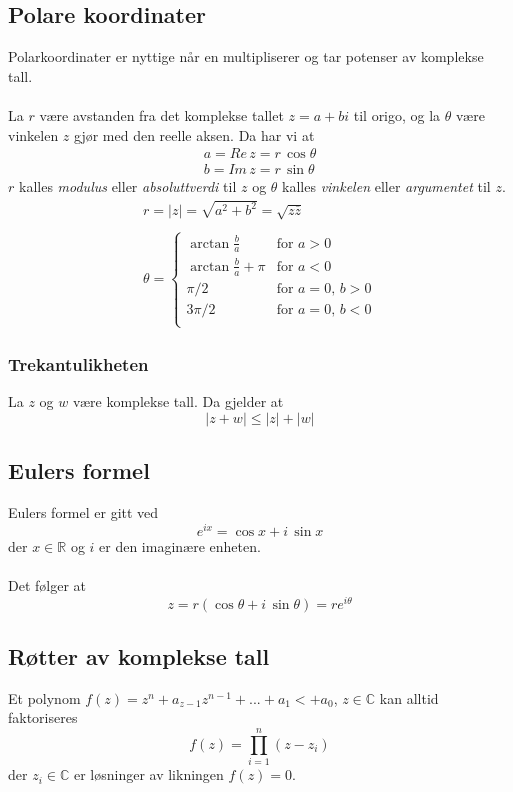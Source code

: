 \documentclass{article}
\begin{document}
\subsection{Polare koordinater}
Polarkoordinater er nyttige når en multipliserer og tar potenser av komplekse tall.
\\\\
La $r$ være avstanden fra det komplekse tallet $z =
a + bi$ til origo, og la $\theta$ være vinkelen $z$ gjør med den reelle aksen. Da har vi at
\begin{gather*}
    a = Re \, z = r \, \cos{\theta} \\
    b = Im \, z = r \, \sin{\theta}
\end{gather*}
$r$ kalles \textit{modulus} eller \textit{absoluttverdi} til $z$ og $\theta$ kalles \textit{vinkelen} eller \textit{argumentet} til $z$.
\begin{gather*}
    r = |z| = \sqrt{a^2 + b^2} = \sqrt{z\overline{z}} \\\\
    \theta =
    \begin{cases}
        \arctan \frac{b}{a} & \text{for } a > 0 \\
        \arctan \frac{b}{a} + \pi & \text{for } a < 0 \\
        \pi / 2 & \text{for } a = 0, \, b > 0 \\
        3\pi / 2 & \text{for } a = 0, \, b < 0 \\
    \end{cases}
\end{gather*}


\subsubsection{Trekantulikheten}
La $z$ og $w$ være komplekse tall. Da gjelder at
\[ |z + w| \leq |z| + |w| \]


\subsection{Eulers formel}
Eulers formel er gitt ved
\[ e^{ix} = \cos{x} + i \, \sin{x} \]
der $x \in \mathbb{R}$ og $i$ er den imaginære enheten.
\\\\
Det følger at
\[ z = r(\cos{\theta} + i \, \sin{\theta}) = re^{i\theta} \]


\subsection{Røtter av komplekse tall}
Et polynom $f(z) = z^n + a_{z-1}z^{n-1} + ... + a_1<+a_0$, $z \in \mathbb{C}$ kan alltid faktoriseres
\[f(z) = \prod_{i=1}^n (z - z_i)\]
der $z_i \in \mathbb{C}$ er løsninger av likningen $f(z) = 0$.
\end{document}
